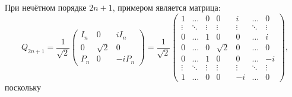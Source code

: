 При нечётном порядке $2n + 1$, примером является матрица:
\begin{equation}~\label{direction:Q:odd}
    Q_{2n+1}
    = \frac{1}{\sqrt{2}}
    \begin{pmatrix}
        I_n & 0        & i I_n   \\
        0   & \sqrt{2} & 0       \\
        P_n & 0        & - i P_n
    \end{pmatrix}
    =  \frac{1}{\sqrt{2}}
    \begin{pmatrix}
        1      & \dots  & 0      & 0        & i      & \dots  & 0      \\
        \vdots & \ddots & \vdots & \vdots   & \vdots & \ddots & \vdots \\
        0      & \dots  & 1      & 0        & 0      & \dots  & i      \\
        0      & \dots  & 0      & \sqrt{2} & 0      & \dots  & 0      \\
        0      & \dots  & 1      & 0        & 0      & \dots  & -i     \\
        \vdots & \ddots & \vdots & \vdots   & \vdots & \ddots & \vdots \\
        1      & \dots  & 0      & 0        & -i     & \dots  & 0
    \end{pmatrix} ,
\end{equation}
поскольку
